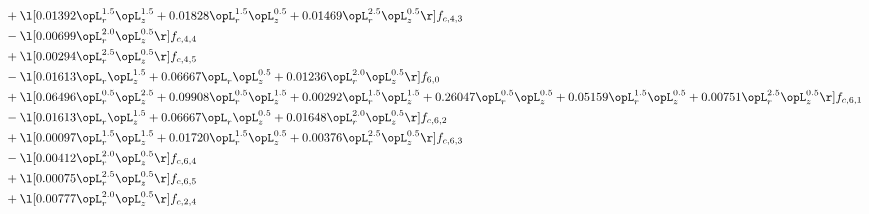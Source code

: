 \begin{alignat}{2}
& + \l[  0.01392 \opL_r^{1.5} \opL_z^{1.5} +  0.01828 \opL_r^{1.5} \opL_z^{0.5} +  0.01469 \opL_r^{2.5} \opL_z^{0.5}  \r] f_{c,4,3} \nonumber \\ 
& - \l[  0.00699 \opL_r^{2.0} \opL_z^{0.5}  \r] f_{c,4,4} \nonumber \\ 
& + \l[  0.00294 \opL_r^{2.5} \opL_z^{0.5}  \r] f_{c,4,5} \nonumber \\ 
& - \l[  0.01613 \opL_r \opL_z^{1.5} +  0.06667 \opL_r \opL_z^{0.5} +  0.01236 \opL_r^{2.0} \opL_z^{0.5}  \r] f_{6,0} \nonumber \\ 
& + \l[  0.06496 \opL_r^{0.5} \opL_z^{2.5} +  0.09908 \opL_r^{0.5} \opL_z^{1.5} +  0.00292 \opL_r^{1.5} \opL_z^{1.5} +  0.26047 \opL_r^{0.5} \opL_z^{0.5} +  0.05159 \opL_r^{1.5} \opL_z^{0.5} +  0.00751 \opL_r^{2.5} \opL_z^{0.5}  \r] f_{c,6,1} \nonumber \\ 
& - \l[  0.01613 \opL_r \opL_z^{1.5} +  0.06667 \opL_r \opL_z^{0.5} +  0.01648 \opL_r^{2.0} \opL_z^{0.5}  \r] f_{c,6,2} \nonumber \\ 
& + \l[  0.00097 \opL_r^{1.5} \opL_z^{1.5} +  0.01720 \opL_r^{1.5} \opL_z^{0.5} +  0.00376 \opL_r^{2.5} \opL_z^{0.5}  \r] f_{c,6,3} \nonumber \\ 
& - \l[  0.00412 \opL_r^{2.0} \opL_z^{0.5}  \r] f_{c,6,4} \nonumber \\ 
& + \l[  0.00075 \opL_r^{2.5} \opL_z^{0.5}  \r] f_{c,6,5} \nonumber \\ 
& + \l[  0.00777 \opL_r^{2.0} \opL_z^{0.5}  \r] f_{c,2,4} \nonumber \\ 
\end{alignat} 


